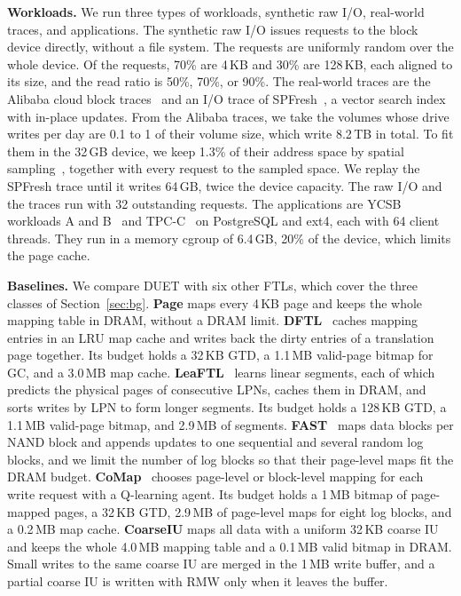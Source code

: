 \textbf{Workloads.} We run three types of workloads, synthetic raw I/O, real-world
traces, and applications. The synthetic raw I/O issues requests to the block device
directly, without a file system. The requests are uniformly random over the whole
device. Of the requests, 70\% are 4\,KB and 30\% are 128\,KB, each aligned to
its size, and the read ratio is 50\%, 70\%, or 90\%.
The real-world traces are the Alibaba cloud
block traces~\cite{alibaba-trace} and an I/O trace of SPFresh~\cite{spfresh}, a vector
search index with in-place updates. From the Alibaba traces, we take the volumes whose
drive writes per day are 0.1 to 1 of their volume size, which write 8.2\,TB in total. To fit them in the
32\,GB device, we keep 1.3\% of their address space by spatial
sampling~\cite{shards}, together with every request to the sampled space. We replay the
SPFresh trace until it writes 64\,GB, twice the device capacity. The raw I/O and the
traces run with 32 outstanding requests.
The applications are YCSB
workloads A and B~\cite{ycsb} and TPC-C~\cite{tpcc} on PostgreSQL and ext4,
each with 64 client threads. They run in a memory cgroup of 6.4\,GB, 20\% of the
device, which limits the page cache.

\textbf{Baselines.} We compare DUET with six other FTLs, which cover the three classes
of Section~\ref{sec:bg}. \textbf{Page} maps
every 4\,KB page and keeps the whole mapping table in DRAM, without a DRAM limit.
\textbf{DFTL}~\cite{dftl} caches mapping entries in an LRU map cache and writes back the
dirty entries of a translation page together. Its budget holds a 32\,KB GTD, a
1.1\,MB valid-page bitmap for GC, and a 3.0\,MB map cache. \textbf{LeaFTL}~\cite{leaftl} learns linear
segments, each of which predicts the physical pages of consecutive LPNs, caches them
in DRAM, and sorts writes by LPN to form longer segments. Its budget holds a 128\,KB
GTD, a 1.1\,MB valid-page bitmap, and 2.9\,MB of segments. \textbf{FAST}~\cite{fast} maps data blocks per NAND block and appends updates to one
sequential and several random log blocks, and we limit the number of log blocks so
that their page-level maps fit the DRAM budget. \textbf{CoMap}~\cite{comap} chooses page-level or
block-level mapping for each write request with a Q-learning agent. Its budget holds a
1\,MB bitmap of page-mapped pages, a 32\,KB GTD, 2.9\,MB of page-level maps for eight
log blocks, and a 0.2\,MB map cache. \textbf{CoarseIU}
maps all data with a uniform 32\,KB coarse IU and keeps the whole 4.0\,MB mapping table and a
0.1\,MB valid bitmap in DRAM.
Small writes to the same coarse IU are merged in the 1\,MB write buffer, and a
partial coarse IU is written with RMW only when it leaves the buffer.


